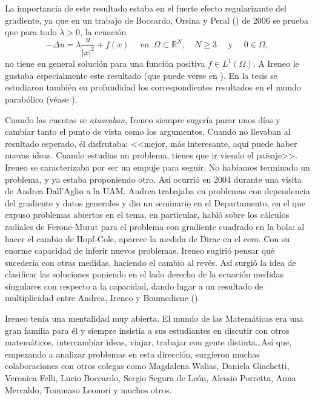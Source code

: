 La importancia de este resultado estaba en el fuerte efecto regularizante del gradiente, ya que en un trabajo de Boccardo, Orsina y Peral {(\cite{BOP})} de 2006 se prueba que para todo $\lambda>0$, la ecuaci\'on 
\begin{equation}
-\Delta u=\lambda\dfrac{u}{|x|^2}+f(x)\quad \mbox{ en }\
\Omega\subset\mathbb{R}^N ,\quad N\ge 3\quad \mbox{ y } \quad 0\in \Omega,
\end{equation}
no tiene en general soluci\'on para una funci\'on positiva $f\in L^1(\Omega)$. A Ireneo le gustaba especialmente este resultado {{(que puede verse en \cite{APP,APP1}).}} En la tesis se estudiaron tambi\'en en profundidad los correspondientes resultados en el mundo parab\'olico {(v\'ease \cite{APP3})}. 

Cuando las cuentas se {\it atascaban}, Ireneo siempre suger\'ia  parar unos d\'ias y cambiar tanto el punto de vista como los argumentos. Cuando no llevaban al resultado esperado, \'el disfrutaba: <<mejor, m\'as interesante, aqu\'i puede haber nuevas ideas. Cuando estudias un problema, tienes que ir viendo el paisaje>>. Ireneo se caracterizaba por ser un empuje para seguir. No hab\'iamos terminado un problema, y ya estaba proponiendo otro. {As\'i ocurri\'o en  2004 durante una visita} de Andrea Dall'Aglio a la UAM. Andrea trabajaba en problemas con dependencia del gradiente y datos generales y dio un seminario en el Departamento, en el que expuso  problemas abiertos en el tema, en particular, habl\'o sobre los c\'alculos radiales de Ferone-Murat para el problema con gradiente cuadrado en la bola: al hacer el cambio de Hopf-Cole, aparece la medida de Dirac en el cero. Con su enorme capacidad de inferir nuevos problemas, Ireneo sugiri\'o pensar qu\'e suceder\'ia con otras medidas, haciendo el cambio al rev\'es. As\'i surgi\'o la idea de clasificar las soluciones poniendo en el lado derecho de la ecuaci\'on medidas singulares con respecto a la capacidad, dando lugar a un resultado de multiplicidad entre Andrea, Ireneo y Boumediene {(\cite{ADP})}.

{Ireneo ten\'ia una mentalidad muy abierta. El mundo de las Matem\'aticas era una gran familia para \'el y siempre insist\'ia a sus estudiantes en discutir con otros matem\'aticos, intercambiar ideas, viajar, trabajar con gente distinta\dots As\'i que, empezando a analizar problemas en esta direcci\'on, surgieron muchas colaboraciones con otros colegas como Magdalena Walias, Daniela Giachetti, Veronica Felli, Lucio Boccardo, Sergio Segura de Le\'on, Alessio Porretta, Anna Mercaldo, Tommaso Leonori  y muchos otros. }


